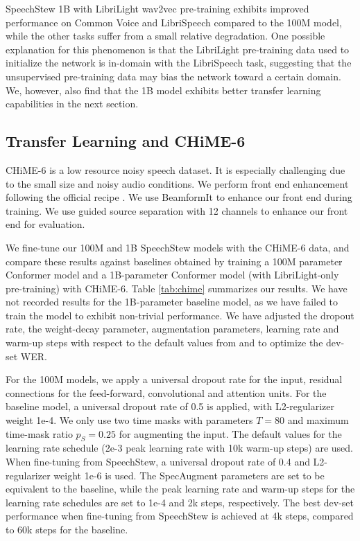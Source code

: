 \documentclass[a4paper]{article}
\begin{document}
SpeechStew 1B with LibriLight wav2vec pre-training \cite{baevski-arxiv-2020} exhibits improved performance on Common Voice and LibriSpeech compared to the 100M model, while the other tasks suffer from a small relative degradation. One possible explanation for this phenomenon is that the LibriLight pre-training data used to initialize the network is in-domain with the LibriSpeech task, suggesting that the unsupervised pre-training data may bias the network toward a certain domain. We, however, also find that the 1B model exhibits better transfer learning capabilities in the next section.

\subsection{Transfer Learning and CHiME-6}

CHiME-6 \cite{watanabe-arxiv-2020} is a low resource noisy speech dataset. It is especially challenging due to the small size and noisy audio conditions. We perform front end enhancement following the official recipe \cite{watanabe-arxiv-2020}. We use BeamformIt to enhance our front end during training. We use guided source separation \cite{boeddecker-chime-2018} with 12 channels to enhance our front end for evaluation.

We fine-tune our 100M and 1B SpeechStew models with the CHiME-6 data, and compare these results against baselines obtained by training a 100M parameter Conformer model and a 1B-parameter Conformer model (with LibriLight-only pre-training) with CHiME-6. Table \ref{tab:chime} summarizes our results. We have not recorded results for the 1B-parameter baseline model, as we have failed to train the model to exhibit non-trivial performance. We have adjusted the dropout rate, the weight-decay parameter, augmentation parameters, learning rate and warm-up steps with respect to the default values from \cite{gulati-interspeech-2020} and \cite{zhang-arxiv-2020} to optimize the dev-set WER.

For the 100M models, we apply a universal dropout rate for the input, residual connections for the feed-forward, convolutional and attention units. For the baseline model, a universal dropout rate of 0.5 is applied, with L2-regularizer weight 1e-4. We only use two time masks with parameters $T=80$ and maximum time-mask ratio $p_S=0.25$ for augmenting the input. The default values for the learning rate schedule (2e-3 peak learning rate with 10k warm-up steps) are used. When fine-tuning from SpeechStew, a universal dropout rate of 0.4 and L2-regularizer weight 1e-6 is used. The SpecAugment parameters are set to be equivalent to the baseline, while the peak learning rate and warm-up steps for the learning rate schedules are set to 1e-4 and 2k steps, respectively. The best dev-set performance when fine-tuning from SpeechStew is achieved at 4k steps, compared to 60k steps for the baseline.
\end{document}
